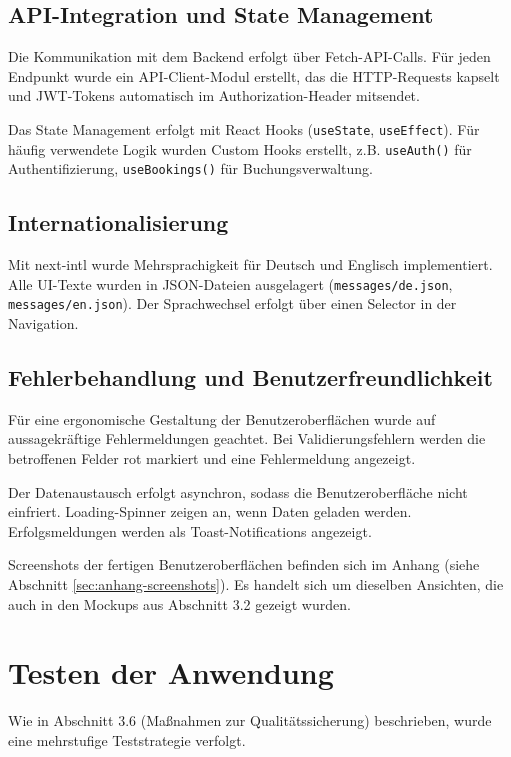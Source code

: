 \documentclass[11pt,a4paper]{report}
\begin{document}
\subsection{API-Integration und State Management}

Die Kommunikation mit dem Backend erfolgt über Fetch-API-Calls. Für jeden Endpunkt wurde ein API-Client-Modul erstellt, das die HTTP-Requests kapselt und JWT-Tokens automatisch im Authorization-Header mitsendet.

Das State Management erfolgt mit React Hooks (\texttt{useState}, \texttt{useEffect}). Für häufig verwendete Logik wurden Custom Hooks erstellt, z.B. \texttt{useAuth()} für Authentifizierung, \texttt{useBookings()} für Buchungsverwaltung.

\subsection{Internationalisierung}

Mit next-intl wurde Mehrsprachigkeit für Deutsch und Englisch implementiert. Alle UI-Texte wurden in JSON-Dateien ausgelagert (\texttt{messages/de.json}, \texttt{messages/en.json}). Der Sprachwechsel erfolgt über einen Selector in der Navigation.

\subsection{Fehlerbehandlung und Benutzerfreundlichkeit}

Für eine ergonomische Gestaltung der Benutzeroberflächen wurde auf aussagekräftige Fehlermeldungen geachtet. Bei Validierungsfehlern werden die betroffenen Felder rot markiert und eine Fehlermeldung angezeigt.

Der Datenaustausch erfolgt asynchron, sodass die Benutzeroberfläche nicht einfriert. Loading-Spinner zeigen an, wenn Daten geladen werden. Erfolgsmeldungen werden als Toast-Notifications angezeigt.

Screenshots der fertigen Benutzeroberflächen befinden sich im Anhang (siehe Abschnitt \ref{sec:anhang-screenshots}). Es handelt sich um dieselben Ansichten, die auch in den Mockups aus Abschnitt 3.2 gezeigt wurden.

\section{Testen der Anwendung}

Wie in Abschnitt 3.6 (Maßnahmen zur Qualitätssicherung) beschrieben, wurde eine mehrstufige Teststrategie verfolgt.
\end{document}
